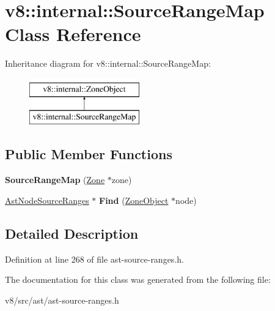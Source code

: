 \hypertarget{classv8_1_1internal_1_1SourceRangeMap}{}\section{v8\+:\+:internal\+:\+:Source\+Range\+Map Class Reference}
\label{classv8_1_1internal_1_1SourceRangeMap}
Inheritance diagram for v8\+:\+:internal\+:\+:Source\+Range\+Map\+:\begin{figure}[H]
\begin{center}
\leavevmode
\includegraphics[height=2.000000cm]{classv8_1_1internal_1_1SourceRangeMap}
\end{center}
\end{figure}
\subsection*{Public Member Functions}
\begin{DoxyCompactItemize}
\item 
\mbox{\label{classv8_1_1internal_1_1SourceRangeMap_aac1d4d6c523bafb5a65be006ec417db8}} 
{\bfseries Source\+Range\+Map} (\mbox{\hyperlink{classv8_1_1internal_1_1Zone}{Zone}} $\ast$zone)
\item 
\mbox{\label{classv8_1_1internal_1_1SourceRangeMap_a2efda552b216cafd633360063ddc968a}} 
\mbox{\hyperlink{classv8_1_1internal_1_1AstNodeSourceRanges}{Ast\+Node\+Source\+Ranges}} $\ast$ {\bfseries Find} (\mbox{\hyperlink{classv8_1_1internal_1_1ZoneObject}{Zone\+Object}} $\ast$node)
\end{DoxyCompactItemize}


\subsection{Detailed Description}


Definition at line 268 of file ast-\/source-\/ranges.\+h.



The documentation for this class was generated from the following file\+:\begin{DoxyCompactItemize}
\item 
v8/src/ast/ast-\/source-\/ranges.\+h\end{DoxyCompactItemize}
